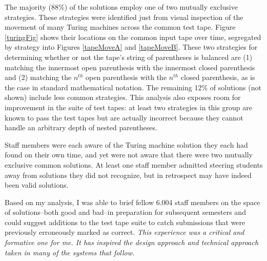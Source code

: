 The majority (88\%) of the solutions employ one of two mutually exclusive strategies. These strategies were identified just from visual inspection of the movement of many Turing machines across the common test tape. Figure \ref{turingFig} shows their locations on the common input tape over time, segregated by strategy into Figures \ref{tapeMoveA} and \ref{tapeMoveB}. These two strategies for determining whether or not the tape's string of parentheses is balanced are (1) matching the innermost open parenthesis with the innermost closed parenthesis and (2) matching the $n^{th}$ open parenthesis with the $n^{th}$ closed parenthesis, as is the case in standard mathematical notation. The remaining 12\% of solutions (not shown) include less common strategies. This analysis also exposes room for improvement in the suite of test tapes: at least two strategies in this group are known to pass the test tapes but are actually incorrect because they cannot handle an arbitrary depth of nested parentheses. 

Staff members were each aware of the Turing machine solution they each had found on their own time, and yet were not aware that there were two mutually exclusive common solutions. At least one staff member admitted steering students away from solutions they did not recognize, but in retrospect may have indeed been valid solutions. 

Based on my analysis, I was able to brief fellow 6.004 staff members on the space of solutions--both good and bad--in preparation for subsequent semesters and could suggest additions to the test tape suite to catch submissions that were previously erroneously marked as correct. {\it This experience was a critical and formative one for me. It has inspired the design approach and technical approach taken in many of the systems that follow.}

